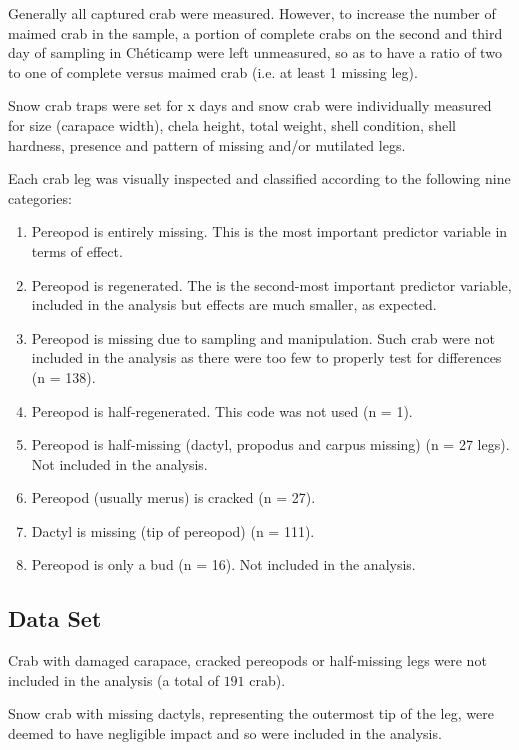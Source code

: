 \documentclass[letterpaper, 10pt]{article}
\begin{document}
Generally all captured crab were measured. 
However, to increase the number of maimed crab in the sample, a portion of complete crabs on the second and third day of sampling in Chéticamp were left unmeasured, so as to have a ratio of two to one of complete versus maimed crab (i.e. at least 1 missing leg). 

Snow crab traps were set for x days and snow crab were individually measured for size (carapace width), chela height, total weight, shell condition, shell hardness, presence and pattern of missing and/or mutilated legs.

Each crab leg was visually inspected and classified according to the following nine categories:
\begin{enumerate}
   \item Pereopod is entirely missing. This is the most important predictor variable in terms of 
         effect.
   \item Pereopod is regenerated. The is the second-most important predictor variable, included in the 
         analysis but effects are much smaller, as expected.
   \item Pereopod is missing due to sampling and manipulation. Such crab were not included in the 
         analysis as there were too few to properly test for differences (n = 138).
   \item Pereopod is half-regenerated. This code was not used (n = 1).
   \item Pereopod is half-missing (dactyl, propodus and carpus missing) (n = 27 legs). 
         Not included in the analysis.
   \item Pereopod (usually merus) is cracked (n = 27). 
   \item Dactyl is missing (tip of pereopod) (n = 111).
   \item Pereopod is only a bud (n = 16). Not included in the analysis.
\end{enumerate}

\subsection{Data Set}

Crab with damaged carapace, cracked pereopods or half-missing legs were not included in the analysis (a total of $191$ crab).

Snow crab with missing dactyls, representing the outermost tip of the leg, were deemed to have negligible impact and so were included in the analysis.
\end{document}
